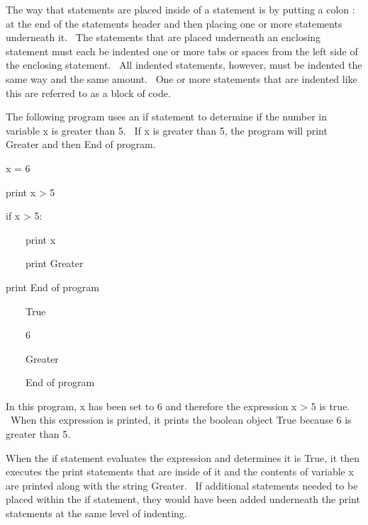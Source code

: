 \documentclass[12pt,twoside]{book}
\begin{document}
\bigskip

The way that statements are placed inside of a statement is by putting a
colon {\textquotesingle}:{\textquotesingle} at the end of the
statement{\textquotesingle}s header and then placing one or more
statements underneath it. \ The statements that are placed underneath
an enclosing statement must each be indented one or more tabs or spaces
from the left side of the enclosing statement. \ All indented
statements, however, must be indented the same way and the same amount.
\ One or more statements that are indented like this are referred to as
a block of code.


\bigskip

The following program uses an if statement to determine if the number in
variable x is greater than 5. \ If x is greater than 5, the program
will print {\textquotedbl}Greater{\textquotedbl} and then
{\textquotedbl}End of program{\textquotedbl}.


\bigskip

x = 6


\bigskip

print x {\textgreater} 5


\bigskip

if x {\textgreater} 5:

\ \ \ \ print x

\ \ \ \ print {\textquotedbl}Greater{\textquotedbl}


\bigskip

print {\textquotedbl}End of program{\textquotedbl}

{\textbar}

\ \ \ \ True

\ \ \ \ 6

\ \ \ \ Greater

\ \ \ \ End of program

In this program, x has been set to 6 and therefore the expression x
{\textgreater} 5 is true. \ When this expression is printed, it prints
the boolean object True because 6 is greater than 5.


\bigskip

When the if statement evaluates the expression and determines it is
True, it then executes the print statements that are inside of it and
the contents of variable x are printed along with the string
{\textquotedbl}Greater{\textquotedbl}. \ If additional statements
needed to be placed within the if statement, they would have been added
underneath the print statements at the same level of indenting.
\end{document}
